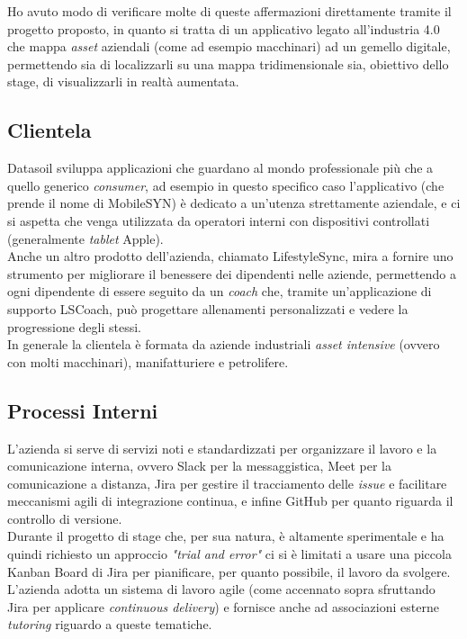 Ho avuto modo di verificare molte di queste affermazioni direttamente tramite il progetto proposto, in quanto si tratta di un applicativo legato all'industria 4.0 che mappa \textit{asset} aziendali (come ad esempio macchinari) ad un gemello digitale, permettendo sia di localizzarli su una mappa tridimensionale sia, obiettivo dello stage, di visualizzarli in realtà aumentata.\\

\subsection{Clientela}
Datasoil sviluppa applicazioni che guardano al mondo professionale più che a quello generico \textit{consumer}, ad esempio in questo specifico caso l'applicativo (che prende il nome di MobileSYN) è dedicato a un'utenza strettamente aziendale, e ci si aspetta che venga utilizzata da operatori interni con dispositivi controllati (generalmente \textit{tablet} Apple). \\
Anche un altro prodotto dell'azienda, chiamato LifestyleSync, mira a fornire uno strumento per migliorare il benessere dei dipendenti nelle aziende, permettendo a ogni dipendente di essere seguito da un \textit{coach} che, tramite un'applicazione di supporto LSCoach, può progettare allenamenti personalizzati e vedere la progressione degli stessi.\\
In generale la clientela è formata da aziende industriali \textit{asset intensive} (ovvero con molti macchinari), manifatturiere e petrolifere.\\

\subsection{Processi Interni}
L'azienda si serve di servizi noti e standardizzati per organizzare il lavoro e la comunicazione interna, ovvero Slack per la messaggistica, Meet per la comunicazione a distanza, Jira per gestire il tracciamento delle \textit{issue} e facilitare meccanismi agili di integrazione continua, e infine GitHub per quanto riguarda il controllo di versione.\\
Durante il progetto di stage che, per sua natura, è altamente sperimentale e ha quindi richiesto un approccio \textit{"trial and error"} ci si è limitati a usare una piccola Kanban Board di Jira per pianificare, per quanto possibile, il lavoro da svolgere.\\
L'azienda adotta un sistema di lavoro agile (come accennato sopra sfruttando Jira per applicare \textit{continuous delivery}) e fornisce anche ad associazioni esterne \textit{tutoring} riguardo a queste tematiche. 

